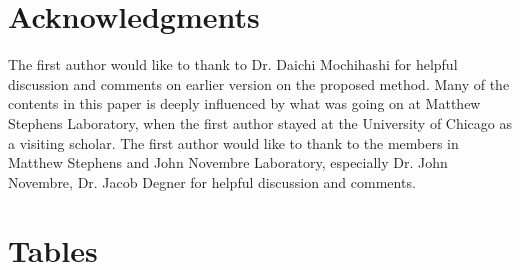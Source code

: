
\section*{Acknowledgments}

The first author would like to thank to Dr. Daichi Mochihashi for helpful discussion and comments on earlier version on the proposed method.
Many of the contents in this paper is deeply influenced by what was going on at Matthew Stephens Laboratory,
when the first author stayed at the University of Chicago as a visiting scholar.
The first author would like to thank to the members in Matthew Stephens and John Novembre Laboratory, especially Dr. John Novembre,
Dr. Jacob Degner for helpful discussion and comments.


%
%
% 

% 




%

\newpage

 \section*{Tables}
% 
%
%




